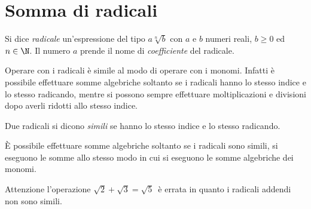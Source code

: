 \section{Somma di radicali}
\label{sec:radicali_somma}

Si dice \emph{radicale} un'espressione del tipo \(a\sqrt[n]b\) con \(a\) e 
\(b\) 
numeri reali, \(b{\geq}0\) ed \(n\in \N\). Il numero \(a\) prende il nome di 
\emph{coefficiente} del radicale.

Operare con i radicali è simile al modo di operare con i monomi. Infatti è 
possibile effettuare somme algebriche soltanto se i radicali hanno lo 
stesso 
indice e lo stesso radicando, mentre si possono sempre effettuare 
moltiplicazioni e divisioni dopo averli ridotti allo stesso indice.
\begin{definizione}
 Due radicali si dicono \emph{simili} se hanno lo stesso indice e lo stesso 
 radicando.
\end{definizione}

È possibile effettuare somme algebriche soltanto se i radicali sono simili, 
si eseguono le somme allo stesso modo in cui si eseguono le somme 
algebriche 
dei monomi.

Attenzione l'operazione \(\sqrt{2}+\sqrt{3}=\sqrt 5\)\, è errata in quanto i 
radicali addendi non sono simili.

\newpage %

